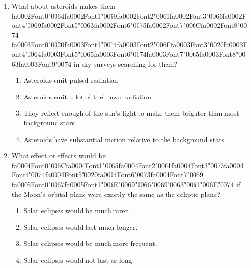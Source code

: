\documentclass[12pt]{article}
\begin{document}
\begin{enumerate}[label=\arabic*.]
\begin{enumerate}[label=(\alph*)]
\end{enumerate}
\item What about asteroids makes them {\csname fa0002Font0\endcsname\char"0064}{\csname fa0002Font1\endcsname\char"0069}{\csname fa0002Font2\endcsname\char"0066}{\csname fa0002Font3\endcsname\char"0066}{\csname fa0002Font4\endcsname\char"0069}{\csname fa0002Font5\endcsname\char"0063}{\csname fa0002Font6\endcsname\char"0075}{\csname fa0002Font7\endcsname\char"006C}{\csname fa0002Font8\endcsname\char"0074} {\csname fa0003Font0\endcsname\char"0020}{\csname fa0003Font1\endcsname\char"0074}{\csname fa0003Font2\endcsname\char"006F}{\csname fa0003Font3\endcsname\char"0020}{\csname fa0003Font4\endcsname\char"0064}{\csname fa0003Font5\endcsname\char"0065}{\csname fa0003Font6\endcsname\char"0074}{\csname fa0003Font7\endcsname\char"0065}{\csname fa0003Font8\endcsname\char"0063}{\csname fa0003Font9\endcsname\char"0074} in sky surveys searching for them?
\begin{enumerate}[label=(\alph*)]
    \item Asteroids emit pulsed radiation
    \item Asteroids emit a lot of their own radiation
    \item They reflect enough of the sun's light to make them brighter than most background stars
    \item Asteroids have substantial motion relative to the background stars
\end{enumerate}
\item What effect or effects would be {\csname fa0004Font0\endcsname\char"006C}{\csname fa0004Font1\endcsname\char"0065}{\csname fa0004Font2\endcsname\char"0061}{\csname fa0004Font3\endcsname\char"0073}{\csname fa0004Font4\endcsname\char"0074}{\csname fa0004Font5\endcsname\char"0020}{\csname fa0004Font6\endcsname\char"0073}{\csname fa0004Font7\endcsname\char"0069} {\csname fa0005Font0\endcsname\char"0067}{\csname fa0005Font1\endcsname\char"006E}{\char"0069}{\char"0066}{\char"0069}{\char"0063}{\char"0061}{\char"006E}{\char"0074} if the Moon's orbital plane were exactly
the same as the ecliptic plane?
\begin{enumerate}[label=(\alph*)]
    \item Solar eclipses would be much rarer.
    \item Solar eclipses would last much longer.
    \item Solar eclipses would be much more frequent.
    \item Solar eclipses would not last as long.
\end{enumerate}
\end{enumerate}
\end{document}
